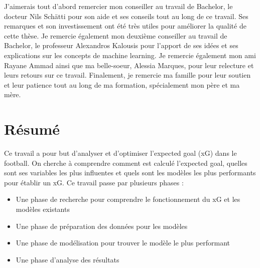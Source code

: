\documentclass[12pt]{article}
\begin{document}
J'aimerais tout d'abord remercier mon conseiller au travail de Bachelor, le docteur Nils Schätti pour son aide et ses conseils tout au long de ce travail. 
Ses remarques et son investissement ont été très utiles pour améliorer la qualité de cette thèse. 
\newline\newline
Je remercie également mon deuxième conseiller au travail de Bachelor, le professeur Alexandros Kalousis pour l'apport de ses idées et ses explications sur les concepts de machine learning.
\newline\newline
Je remercie également mon ami Rayane Ammad ainsi que ma belle-soeur, Alessia Marques, pour leur relecture et leurs retours sur ce travail.
\newline\newline
Finalement, je remercie ma famille pour leur soutien et leur patience tout au long de ma formation, spécialement mon père et ma mère.

\newpage

\section{Résumé}
Ce travail a pour but d'analyser et d'optimiser l'expected goal (xG) dans le football.
On cherche à comprendre comment est calculé l'expected goal, quelles sont ses variables les plus influentes et quels sont les modèles les plus performants pour établir un xG.
\newline\newline
Ce travail passe par plusieurs phases :
\begin{itemize}
    \item Une phase de recherche pour comprendre le fonctionnement du xG et les modèles existants
    \item Une phase de préparation des données pour les modèles
    \item Une phase de modélisation pour trouver le modèle le plus performant
    \item Une phase d'analyse des résultats
\end{itemize}


\newpage

\listoftables

\newpage

\listoffigures

\newpage

\tableofcontents
\newpage
\end{document}
